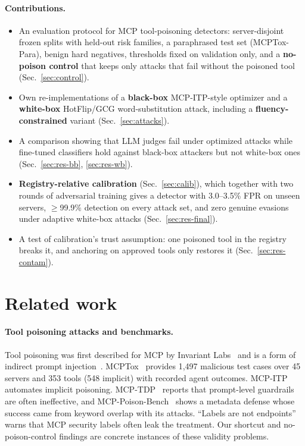 \documentclass{article}
\begin{document}
\paragraph{Contributions.}
\begin{itemize}
\item An evaluation protocol for MCP tool-poisoning detectors: server-disjoint frozen splits with held-out risk
      families, a paraphrased test set (MCPTox-Para), benign hard negatives, thresholds fixed on validation only, and a
      \textbf{no-poison control} that keeps only attacks that fail without the poisoned tool (Sec.~\ref{sec:control}).
\item Own re-implementations of a \textbf{black-box} MCP-ITP-style optimizer and a \textbf{white-box} HotFlip/GCG
      word-substitution attack, including a \textbf{fluency-constrained} variant (Sec.~\ref{sec:attacks}).
\item A comparison showing that LLM judges fail under optimized attacks while fine-tuned classifiers hold against
      black-box attackers but not white-box ones (Sec.~\ref{sec:res-bb}, \ref{sec:res-wb}).
\item \textbf{Registry-relative calibration} (Sec.~\ref{sec:calib}), which together with two rounds of adversarial
      training gives a detector with 3.0--3.5\% FPR on unseen servers, $\ge$99.9\% detection on every attack set, and zero
      genuine evasions under adaptive white-box attacks (Sec.~\ref{sec:res-final}).
\item A test of calibration's trust assumption: one poisoned tool in the registry breaks it, and anchoring on approved
      tools only restores it (Sec.~\ref{sec:res-contam}).
\end{itemize}

\section{Related work}

\paragraph{Tool poisoning attacks and benchmarks.} Tool poisoning was first described for MCP by Invariant
Labs~\cite{invariant2025toolpoisoning} and is a form of indirect prompt injection~\cite{greshake2023indirect}.
MCPTox~\cite{wang2026mcptox} provides 1,497 malicious test cases over 45 servers and 353 tools (548 implicit) with recorded agent outcomes.
MCP-ITP~\cite{li2026mcpitp} automates implicit poisoning. MCP-TDP~\cite{mcptdp2026} reports that prompt-level guardrails
are often ineffective, and MCP-Poison-Bench~\cite{mcppoisonbench2026} shows a metadata defense whose success came from
keyword overlap with its attacks. ``Labels are not endpoints''~\cite{labels2026} warns that MCP security labels often
leak the treatment. Our shortcut and no-poison-control findings are concrete instances of these validity problems.
\end{document}
